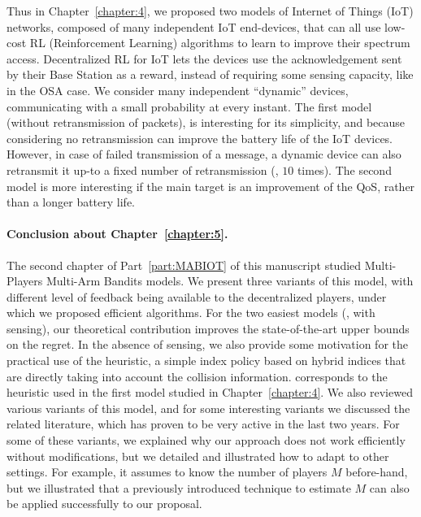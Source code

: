 Thus in Chapter~\ref{chapter:4}, we proposed two models of Internet of Things (IoT) networks, composed of many independent IoT end-devices,
that can all use low-cost RL (Reinforcement Learning) algorithms to learn to improve their spectrum access.
%
Decentralized RL for IoT lets the devices use the acknowledgement sent by their Base Station as a reward, instead of requiring some sensing capacity, like in the OSA case.
We consider many independent ``dynamic'' devices, communicating with a small probability at every instant.
The first model (without retransmission of packets),
is interesting for its simplicity, and because considering no retransmission can improve the battery life of the IoT devices.
%
However, in case of failed transmission of a message, a dynamic device can also retransmit it up-to a fixed number of retransmission (\eg, $10$ times).
%
The second model is more interesting if the main target is an improvement of the QoS, rather than a longer battery life.



\paragraph{Conclusion about \textbf{Chapter~\ref{chapter:5}}.}

The second chapter of Part~\ref{part:MABIOT} of this manuscript studied Multi-Players Multi-Arm Bandits models.
%
We present three variants of this model,
with different level of feedback being available to the decentralized players, under which we proposed efficient algorithms.
For the two easiest models (\ie, with sensing), our theoretical contribution improves the state-of-the-art upper bounds on the regret.
In the absence of sensing, we also provide some motivation for the practical use of the \Selfish{} heuristic, a simple index policy based on hybrid indices that are directly taking  into account the collision information.
\Selfish{} corresponds to the heuristic used in the first model studied in Chapter~\ref{chapter:4}.
%
We also reviewed various variants of this model, and for some interesting variants we discussed the related literature, which has proven to be very active in the last two years.
For some of these variants, we explained why our approach does not work efficiently without modifications, but we detailed and illustrated how to adapt \MCTopM{} to other settings.
For example, it assumes to know the number of players $M$ before-hand, but we illustrated that a previously introduced technique to estimate $M$ can also be applied successfully to our proposal.


